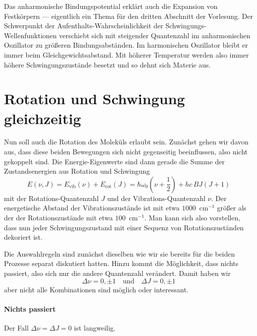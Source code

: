  
 
Das anharmonische Bindungspotential erklärt auch die Expansion von Festkörpern --- eigentlich ein Thema für den dritten Abschnitt der Vorlesung. Der Schwerpunkt der Aufenthalts-Wahrscheinlichkeit der Schwingungs-Wellenfunktionen verschiebt sich mit steigender Quantenzahl im anharmonischen Oszillator zu größeren Bindungsabständen. Im harmonischen Oszillator bleibt er immer beim Gleichgewichtsabstand. Mit höherer Temperatur werden also immer höhere Schwingungszustände besetzt und so dehnt sich Materie aus.


\section{Rotation und Schwingung gleichzeitig}

Nun soll auch die Rotation des Moleküls erlaubt sein. Zunächst gehen wir davon aus, dass diese beiden Bewegungen sich nicht gegenseitig beeinflussen, also nicht gekoppelt sind. Die Energie-Eigenwerte sind dann gerade die Summe der Zustandsenergien aus Rotation und Schwingung
\begin{equation}
E (\nu, J) = E_\text{vib}(\nu) + E_\text{rot}(J) = \hbar \omega_0 \left(\nu + \frac{1}{2} \right) + h c \, B J \left( J+1 \right) \label{eq:vib_rot_simple}
\end{equation}
mit der Rotations-Quantenzahl $J$ und der Vibrations-Quantenzahl $\nu$. Der energetische Abstand der Vibrationszustände ist mit etwa $1000$~cm$^{-1}$  größer als der der Rotationszustände mit etwa $100$~cm$^{-1}$. Man kann sich also vorstellen, dass nun jeder Schwingungszustand mit einer Sequenz von Rotationszuständen dekoriert ist.

Die Auswahlregeln sind zunächst dieselben wie wir sie bereits für die beiden Prozesse separat diskutiert hatten. Hinzu kommt die Möglichkeit, dass nichts passiert, also sich nur die andere Quantenzahl verändert. Damit haben wir
\begin{equation}
 \Delta \nu = 0, \pm 1 \quad \text{und} \quad \Delta J = 0, \pm 1 
\end{equation}
aber nicht alle Kombinationen sind möglich oder interessant.

\paragraph{Nichts passiert} Der Fall $\Delta \nu = \Delta J = 0$ ist langweilig.


